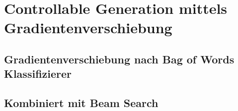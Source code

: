 \section{Controllable Generation mittels Gradientenverschiebung}\raggedbottom

\subsection{Gradientenverschiebung nach Bag of Words Klassifizierer}

\subsection{Kombiniert mit Beam Search}

\pagebreak
